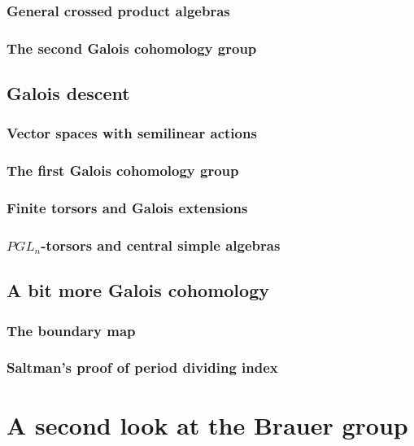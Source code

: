 \documentclass[12pt]{report}
\theoremstyle{plain}
\begin{document}
\subsection{General crossed product algebras}

\subsection{The second Galois cohomology group}

\section{Galois descent}

\subsection{Vector spaces with semilinear actions}

\subsection{The first Galois cohomology group}

\subsection{Finite torsors and Galois extensions}

\subsection{$PGL_n$-torsors and central simple algebras}

\section{A bit more Galois cohomology}

\subsection{The boundary map}

\subsection{Saltman's proof of period dividing index}

\chapter{A second look at the Brauer group}
\end{document}

